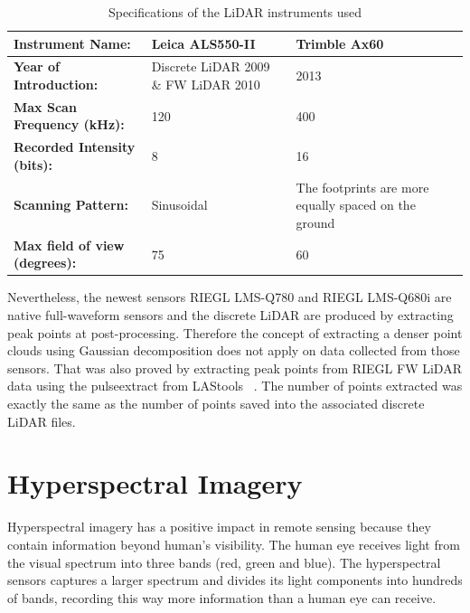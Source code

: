 \documentclass{subfiles}
\begin{document}
	
	\begin{table}[!htbp]
		
		\label{tab:InstrumentsSecifications}%
		\centering
		\begin{tabular}{|l||m{}|m{}|}
			\hline
			\textbf{Instrument Name:}	& \textbf{Leica ALS550-II}     & \textbf{Trimble Ax60  }    \\
			\hline\hline
			\textbf{Year of Introduction: }&Discrete LiDAR 2009 \& FW LiDAR 2010& 2013  \\
			\hline
			\textbf{Max Scan Frequency (kHz):} & 120 & 400  \\
			\hline
			\textbf{Recorded Intensity (bits):} & 8 & 16 \\
			\hline
			\textbf{Scanning Pattern:} & Sinusoidal  & The footprints are more equally spaced on the ground \\			
			\hline
			\textbf{Max field of view (degrees):} & 75 & 60	\\
			\hline
		\end{tabular}%
		\caption{Specifications of the LiDAR instruments used}
	\end{table}
	
	\par Nevertheless, the newest sensors RIEGL LMS-Q780 and RIEGL LMS-Q680i are native full-waveform sensors and the discrete LiDAR are produced by extracting peak points at post-processing. Therefore the concept of extracting a denser point clouds using Gaussian decomposition does not apply on data collected from those sensors. That was also proved by extracting peak points from RIEGL FW LiDAR data using the pulseextract from LAStools ~\cite{LAStools}. The number of points extracted was exactly the same as the number of points saved into the associated discrete LiDAR files.

	\section{Hyperspectral Imagery}
	\par Hyperspectral imagery has a positive impact in remote sensing because they contain information beyond human's visibility. The human eye receives light from the visual spectrum into three bands (red, green and blue). The hyperspectral sensors captures a larger spectrum and divides its light components into hundreds of bands, recording this way more information than a human eye can receive\cite{Smith2012}. 
	
\end{document}
